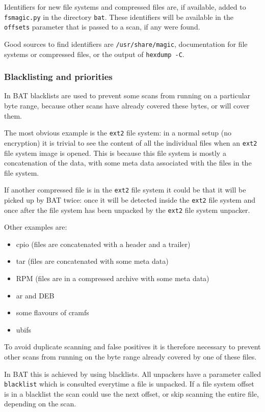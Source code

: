 \documentclass[10pt]{article}
\begin{document}
Identifiers for new file systems and compressed files are, if available, added
to \texttt{fsmagic.py} in the directory \texttt{bat}. These identifiers will be
available in the \texttt{offsets} parameter that is passed to a scan, if any
were found.

Good sources to find identifiers are \texttt{/usr/share/magic}, documentation
for file systems or compressed files, or the output of \texttt{hexdump -C}.

\subsubsection{Blacklisting and priorities}

In BAT blacklists are used to prevent some scans from running on a particular
byte range, because other scans have already covered these bytes, or will cover
them.

The most obvious example is the \texttt{ext2} file system: in a normal setup
(no encryption) it is trivial to see the content of all the individual files
when an \texttt{ext2} file system image is opened. This is because this file
system is mostly a concatenation of the data, with some meta data associated
with the files in the file system.

If another compressed file is in the \texttt{ext2} file system it could be that
it will be picked up by BAT twice: once it will be detected inside the
\texttt{ext2} file system and once after the file system has been unpacked by
the \texttt{ext2} file system unpacker.

Other examples are:

\begin{itemize}
\item cpio (files are concatenated with a header and a trailer)
\item tar (files are concatenated with some meta data)
\item RPM (files are in a compressed archive with some meta data)
\item ar and DEB
\item some flavours of cramfs
\item ubifs
\end{itemize}

To avoid duplicate scanning and false positives it is therefore necessary to
prevent other scans from running on the byte range already covered by one of
these files.

In BAT this is achieved by using blacklists. All unpackers have a parameter
called \texttt{blacklist} which is consulted everytime a file is unpacked. If
a file system offset is in a blacklist the scan could use the next offset, or
skip scanning the entire file, depending on the scan.
\end{document}
